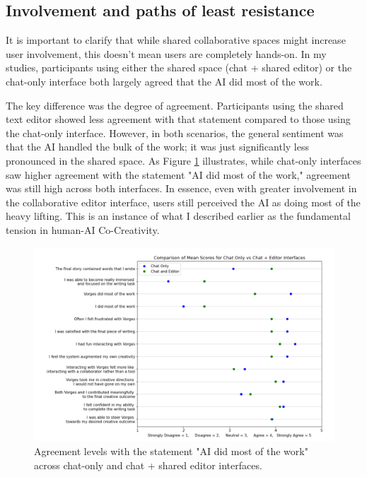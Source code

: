 \subsection{Involvement and paths of least resistance}

It is important to clarify that while shared collaborative spaces might increase user involvement, this doesn't mean users are completely hands-on. In my studies, participants using either the shared space (chat + shared editor) or the chat-only interface both largely agreed that the AI did most of the work.

The key difference was the degree of agreement. Participants using the shared text editor showed less agreement with that statement compared to those using the chat-only interface. However, in both scenarios, the general sentiment was that the AI handled the bulk of the work; it was just significantly less pronounced in the shared space. As Figure \ref{fig:graphsharedspaces} illustrates, while chat-only interfaces saw higher agreement with the statement "AI did most of the work," agreement was still high across both interfaces. In essence, even with greater involvement in the collaborative editor interface, users still perceived the AI as doing most of the heavy lifting. This is an instance of what I described earlier as the fundamental tension in human-AI Co-Creativity.

\begin{figure}
\centering
\includegraphics[width=1\linewidth]{graphsharedspaces.png}
\caption{Agreement levels with the statement "AI did most of the work" across chat-only and chat + shared editor interfaces.}
\label{fig:graphsharedspaces}
\end{figure}

